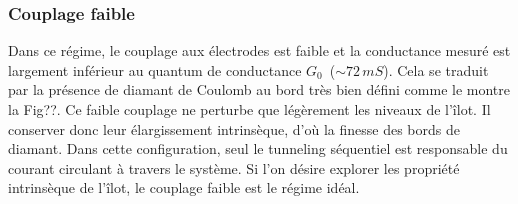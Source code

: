 \subsubsection{Couplage faible}
Dans ce régime, le couplage aux électrodes est faible et la conductance mesuré est largement inférieur au quantum de conductance $G_0$~($\sim 72\,mS$). Cela se traduit par la présence de diamant de Coulomb au bord très bien défini comme le montre la Fig??. Ce faible couplage ne perturbe que légèrement les niveaux de l'îlot. Il conserver donc leur élargissement intrinsèque, d'où la finesse des bords de diamant. Dans cette configuration, seul le tunneling séquentiel est responsable du courant circulant à travers le système. Si l'on désire explorer les propriété intrinsèque de l'îlot, le couplage faible est le régime idéal.
